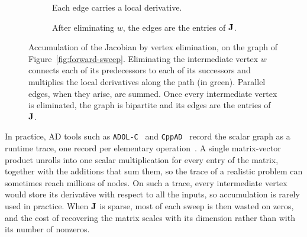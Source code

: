 \begin{figure}[tb]
\centering
\begin{subfigure}[c]{0.48\textwidth}
\centering
{}
\caption{Each edge carries a local derivative.}
\end{subfigure}
\hfill
\begin{subfigure}[c]{0.48\textwidth}
\centering
{}
\caption{After eliminating $w$, the edges are the entries of $\mathbf{J}$.}
\end{subfigure}
\caption[Accumulation by vertex elimination]{Accumulation of the Jacobian by vertex
elimination, on the graph of Figure~\ref{fig:forward-sweep}. Eliminating the intermediate
vertex $w$ connects each of its predecessors to each of its successors and multiplies the
local derivatives along the path (in green). Parallel edges, when they arise, are summed.
Once every intermediate vertex is eliminated, the graph is bipartite and its edges are the
entries of $\mathbf{J}$.}
\label{fig:vertex-elimination}
\end{figure}

In practice, AD tools such as \texttt{ADOL-C}~\cite{griewank1996adolc} and
\texttt{CppAD}~\cite{bell2012cppad}
record the scalar graph as a runtime trace, one record per elementary
operation~\cite{griewank2008evaluating, Naumann2011}. A single matrix-vector product
unrolls into one scalar multiplication for every entry of the matrix, together with the
additions that sum them, so the trace of a realistic problem can sometimes reach millions of nodes.
On such a trace, every intermediate vertex would store its derivative with respect to all
the inputs, so accumulation is rarely used in practice.
When $\mathbf{J}$ is sparse, most of each sweep is then wasted on
zeros, and the cost of recovering the matrix scales with its dimension rather than with its
number of nonzeros.

